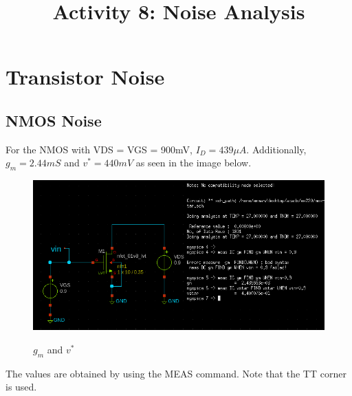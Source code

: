 \documentclass[conference]{IEEEtran}
\begin{document}
 


\title{Activity 8: Noise Analysis}

\author{
}

\maketitle
\section{Transistor Noise}
\subsection{NMOS Noise}
For the NMOS with VDS = VGS = 900mV, $I_D=439\mu A$. Additionally, $g_m=2.44mS$ and $v^*=440mV$ as seen in the image below.
\begin{figure}[H]
	\centering
	\includegraphics[scale=0.32]{gm-vstar.png}
	\label{fig:gm-vstar-NMOS} 
	\caption{$g_m$ and $v^*$}
\end{figure}
The values are obtained by using the MEAS command. Note that the TT corner is used.
\vspace{8pt}
\end{document}
